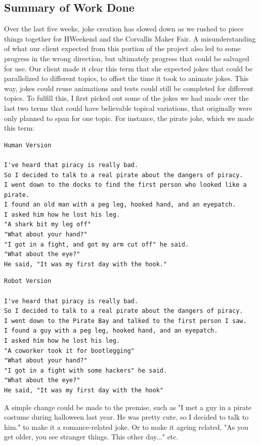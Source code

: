 \documentclass[onecolumn, draftclsnofoot,10pt, compsoc]{IEEEtran}
\begin{document}
\subsection{Summary of Work Done}
Over the last five weeks, joke creation has slowed down as we rushed to piece things together for HWeekend and the Corvallis Maker Fair. A misunderstanding of what our client expected from this portion of the project also led to some progress in the wrong direction, but ultimately progress that could be salvaged for use.
Our client made it clear this term that she expected jokes that could be parallelized to different topics, to offset the time it took to animate jokes. This way, jokes could reuse animations and tests could still be completed for different topics.
To fulfill this, I first picked out some of the jokes we had made over the last two terms that could have believable topical variations, that originally were only planned to span for one topic. For instance, the pirate joke, which we made this term:

\begin{lstlisting}
Human Version

I've heard that piracy is really bad.
So I decided to talk to a real pirate about the dangers of piracy.
I went down to the docks to find the first person who looked like a pirate.
I found an old man with a peg leg, hooked hand, and an eyepatch.
I asked him how he lost his leg.
"A shark bit my leg off"
"What about your hand?"
"I got in a fight, and got my arm cut off" he said.
"What about the eye?"
He said, "It was my first day with the hook."
\end{lstlisting}

\begin{lstlisting}
Robot Version

I've heard that piracy is really bad.
So I decided to talk to a real pirate about the dangers of piracy.
I went down to the Pirate Bay and talked to the first person I saw.
I found a guy with a peg leg, hooked hand, and an eyepatch.
I asked him how he lost his leg.
"A coworker took it for bootlegging"
"What about your hand?"
"I got in a fight with some hackers" he said.
"What about the eye?"
He said, "It was my first day with the hook"
\end{lstlisting}

A simple change could be made to the premise, such as "I met a guy in a pirate costume during halloween last year. He was pretty cute, so I decided to talk to him." to make it a romance-related joke. Or to make it ageing related, "As you get older, you see stranger things. This other day..." etc.
\end{document}
